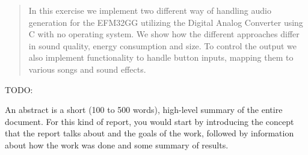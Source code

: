 \begin{abstract}

In this exercise we implement two different way of handling audio generation for the EFM32GG utilizing the Digital Analog Converter using C with no operating system. We show how the different approaches differ in sound quality, energy consumption and size. To control the output we also implement functionality to handle button inputs, mapping them to various songs and sound effects. %

\end{abstract}
TODO:

An abstract is a short (100 to 500 words), high-level summary of the entire
document. For this kind of report, you would start by introducing the concept
that the report talks about and the goals of the work, followed by
information about how the work was done and some summary of results.
